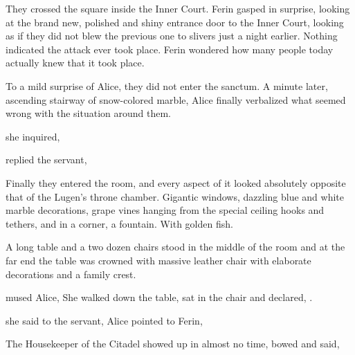 They crossed the square inside the Inner Court. Ferin gasped in surprise, looking at the brand new, polished and shiny entrance door to the Inner Court, looking as if they did not blew the previous one to slivers just a night earlier. Nothing indicated the attack ever took place. Ferin wondered how many people today actually knew that it took place.

To a mild surprise of Alice, they did not enter the sanctum. A minute later, ascending stairway of snow-colored marble, Alice finally verbalized what seemed wrong with the situation around them.

 she inquired, 

 replied the servant, 

Finally they entered the room, and every aspect of it looked absolutely opposite that of the Lugen's throne chamber. Gigantic windows, dazzling blue and white marble decorations, grape vines hanging from the special ceiling hooks and tethers, and in a corner, a fountain. With golden fish.

A long table and a two dozen chairs stood in the middle of the room and at the far end the table was crowned with massive leather chair with elaborate decorations and a family crest.

 mused Alice,  She walked down the table, sat in the chair and declared, .

 she said to the servant,  Alice pointed to Ferin, 

The Housekeeper of the Citadel showed up in almost no time, bowed and said, 

